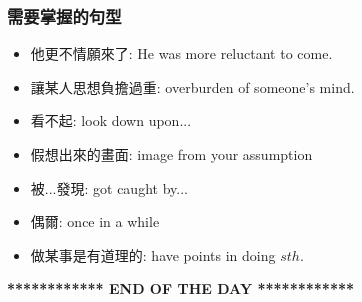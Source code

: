 \subsubsection*{需要掌握的句型}
\begin{multicols}{2}
\begin{itemize}
  \itemsep0em
  \item 他更不情願來了: He was more reluctant to come.
  \item 讓某人思想負擔過重: overburden of someone's mind.
  \item 看不起: look down upon...
  \item 假想出來的畫面: image from your assumption
  \item 被...發現: got caught by...
  \item 偶爾: once in a while
  \item 做某事是有道理的: have points in doing $sth.$
\end{itemize}
\end{multicols}

\vspace{15mm}

\begin{center}
  \textbf{************ END OF THE DAY ************}
\end{center}